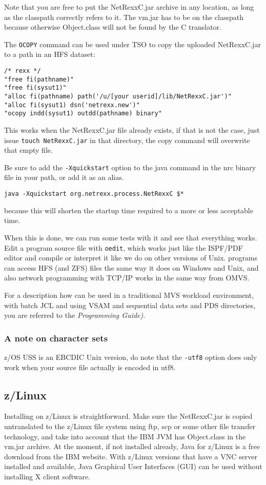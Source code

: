 Note that you are free to put the NetRexxC.jar archive in any
location, as long as the classpath correctly refers to it. The vm.jar
has to be on the classpath because otherwise Object.class will not be
found by the \nr{}C translator.

The \texttt{OCOPY} command can be used under TSO to copy the uploaded
NetRexxC.jar to a path in an HFS dataset:
\begin{verbatim}
/* rexx */                                             
"free fi(pathname)"                                    
"free fi(sysut1)"                                      
"alloc fi(pathname) path('/u/[your userid]/lib/NetRexxC.jar')"
"alloc fi(sysut1) dsn('netrexx.new')"                  
"ocopy indd(sysut1) outdd(pathname) binary"            
\end{verbatim}
This works when the NetRexxC.jar file already exists, if that is not the
case, just issue \texttt{touch NetRexxC.jar} in that directory, the
copy command will overwrite that empty file.

Be sure to add the \texttt{-Xquickstart} option to the java command in
the nrc binary file in your path, or add it as an alias.
\begin{verbatim}
java -Xquickstart org.netrexx.process.NetRexxC $*
\end{verbatim}
because this will shorten the startup time required to a more or less
acceptable time.

When this is done, we can run some tests with it and see that
everything works. Edit a program source file with \texttt{oedit},
which works just like the ISPF/PDF editor and compile or interpret it
like we do on other versions of Unix. \nr{} programs can access HFS (and
ZFS) files the same way it does on Windows and Unix, and also network
programming with TCP/IP works in the same way from OMVS.

For a description how \nr{} can be used in a traditional MVS
workload environment, with batch JCL and using VSAM and sequential
data sets and PDS directories, you are referred to the \emph{\nr{}
  Programming Guide)}.
\subsubsection{A note on character sets}
z/OS USS is an EBCDIC Unix version, do note that the \texttt{-utf8}
option does only work when your source file actually is encoded in
utf8.
\subsection{z/Linux}
Installing on z/Linux is straightforward. Make sure the NetRexxC.jar
is copied untranslated to the z/Linux file system using ftp, scp or
some other file transfer technology, and take into
account that the IBM JVM has Object.class in the vm.jar archive. At
the moment, if not installed already, Java for z/Linux is a free download from the IBM website. With
z/Linux versions that have a VNC server installed and available, Java
Graphical User Interfaces (GUI) can be used without installing X client software. 